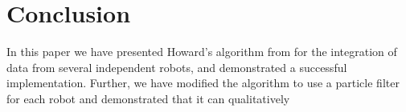\section{Conclusion}
\label{S:Conc}


In this paper we have presented Howard’s algorithm from \cite{howard2006multi} for the integration of data from several independent robots, and demonstrated a successful implementation.  Further, we have modified the algorithm to use a particle filter for each robot and demonstrated that it can qualitatively 